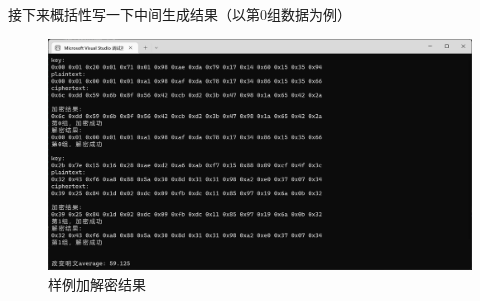 接下来概括性写一下中间生成结果（以第0组数据为例）\\
\begin{figure}[thbp!]
	\centering
	\includegraphics[height=10 CM]{figure/003}
	\caption{样例加解密结果}
	\label{fig:样例加解密结果}
\end{figure}

